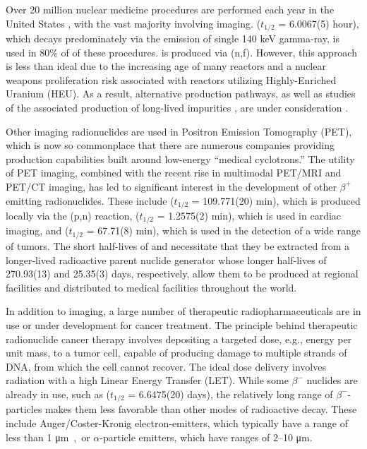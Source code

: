 \documentclass[letterpaper]{ar-1col}
\newcommand{\mmicro}{\si\micro}
\begin{document}
Over 20 million nuclear medicine procedures are performed each year in the United States \cite{Met09}, with the vast majority involving imaging.
  ($t_{1/2}$ = 6.0067(5) hour), which decays predominately via the emission of single 140 keV gamma-ray, is used in 80\% of of these procedures.
 is produced via (n,f).
 However, this approach is less than ideal due to the increasing age of many reactors \cite{Qai12} and a nuclear weapons proliferation risk associated with reactors utilizing Highly-Enriched Uranium (HEU).
 As a result, alternative  production pathways, as well as studies of the associated production of long-lived impurities \cite{Updegraff2013}, are under consideration \cite{Rut09}.



Other imaging radionuclides are used in Positron Emission Tomography (PET), which is now so commonplace that
there are numerous companies   providing production capabilities built around low-energy \enquote{medical cyclotrons.} 
The utility of PET imaging, combined with the recent rise in multimodal PET/MRI and PET/CT imaging,  has
led to significant interest in the development of other $\beta^+$ emitting radionuclides.
These include  ($t_{1/2}$ = 109.771(20) min), which is produced locally via the (p,n) reaction,  ($t_{1/2}$ = 1.2575(2) min), which is used in cardiac imaging, and   ($t_{1/2}$ = 67.71(8) min), which is used in the detection of a wide range of tumors.
 The short half-lives of  and  necessitate that they be extracted from a longer-lived radioactive parent nuclide generator whose longer half-lives of 270.93(13) and 25.35(3) days, respectively, allow them to be produced at regional facilities and distributed to medical facilities throughout the world.
 

In addition to imaging, a large number of therapeutic radiopharmaceuticals are in use or under development for cancer treatment.
 The principle behind therapeutic radionuclide cancer therapy involves depositing a targeted dose, e.g., energy per unit mass, to a tumor cell,  capable of producing damage to multiple strands of DNA, from which the cell cannot recover.
 The ideal dose delivery involves radiation with a high Linear Energy Transfer (LET).
 While some $\beta^-$ nuclides are already in use, such as  ($t_{1/2}$ = 6.6475(20) days), the relatively long range of $\beta^-$-particles makes them less favorable than other modes of radioactive decay.
 These include Auger/Coster-Kronig electron-emitters, which typically have a range of less than 1 \mmicro m, or $\alpha$-particle emitters, which have ranges of 2--10 \mmicro m.
 
\end{document}
